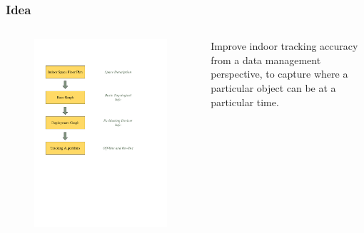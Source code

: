 
\begin{frame}
\frametitle{Idea}

\begin{columns}[c]

    \begin{figure}[tb]
      \includegraphics[width=\columnwidth]{figures/2-1/2-1-1.pdf}
    \end{figure}

    \pause
     \textrm{Improve indoor tracking accuracy from a data management perspective, to capture where a particular object can be at a particular time.}

\end{columns}

\end{frame}

